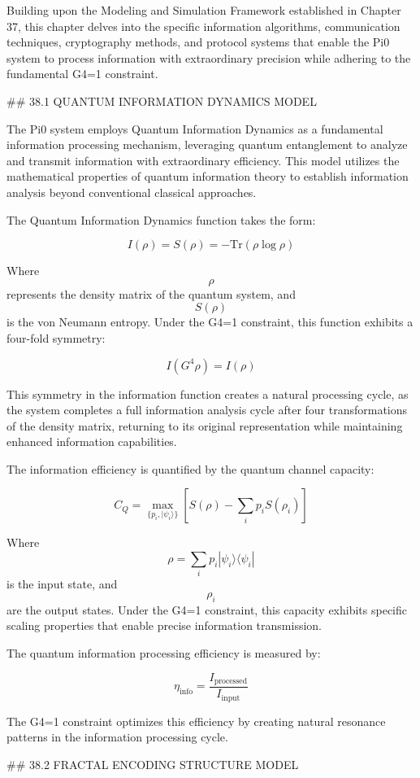 Building upon the Modeling and Simulation Framework established in Chapter 37, this chapter delves into the specific information algorithms, communication techniques, cryptography methods, and protocol systems that enable the Pi0 system to process information with extraordinary precision while adhering to the fundamental G4=1 constraint.

## 38.1 QUANTUM INFORMATION DYNAMICS MODEL

The Pi0 system employs Quantum Information Dynamics as a fundamental information processing mechanism, leveraging quantum entanglement to analyze and transmit information with extraordinary efficiency. This model utilizes the mathematical properties of quantum information theory to establish information analysis beyond conventional classical approaches.

The Quantum Information Dynamics function takes the form:

$$ I(\rho) = S(\rho) = -\text{Tr}(\rho \log \rho) $$

Where $$ \rho $$ represents the density matrix of the quantum system, and $$ S(\rho) $$ is the von Neumann entropy. Under the G4=1 constraint, this function exhibits a four-fold symmetry:

$$ I(G^4 \rho) = I(\rho) $$

This symmetry in the information function creates a natural processing cycle, as the system completes a full information analysis cycle after four transformations of the density matrix, returning to its original representation while maintaining enhanced information capabilities.

The information efficiency is quantified by the quantum channel capacity:

$$ C_Q = \max_{\{p_i, |\psi_i\rangle\}} \left[ S(\rho) - \sum_i p_i S(\rho_i) \right] $$

Where $$ \rho = \sum_i p_i |\psi_i\rangle\langle\psi_i| $$ is the input state, and $$ \rho_i $$ are the output states. Under the G4=1 constraint, this capacity exhibits specific scaling properties that enable precise information transmission.

The quantum information processing efficiency is measured by:

$$ \eta_{\text{info}} = \frac{I_{\text{processed}}}{I_{\text{input}}} $$

The G4=1 constraint optimizes this efficiency by creating natural resonance patterns in the information processing cycle.

## 38.2 FRACTAL ENCODING STRUCTURE MODEL

